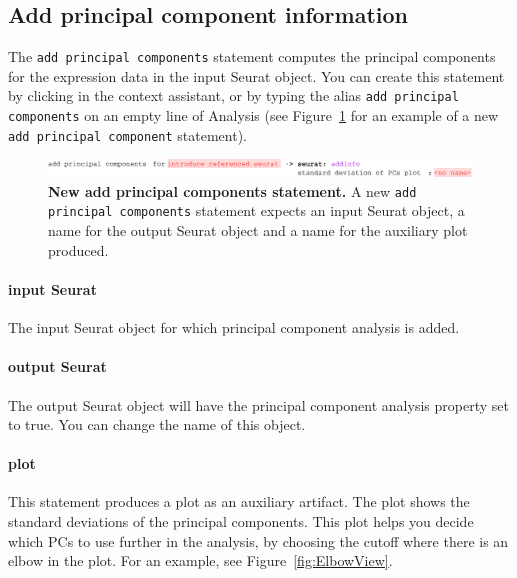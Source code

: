 \subsection{Add principal component information}
The \texttt{add principal components} statement computes the principal components for the expression
data in the input Seurat object. You can create this statement by clicking
 in the context assistant, or by typing
the alias \texttt{add principal components} on an empty line of Analysis (see Figure~\ref{fig:AddPCA}
for an example of a new \texttt{add principal component} statement).

\begin{figure}[h!tbp]
  \centering
    \includegraphics[width=\figWidthWide]{figures/AddPCA.pdf}
    \caption[New add principal components statement.]{\textbf{New add principal components statement.} A new
    \texttt{add principal components} statement expects an input Seurat object, a name for the output Seurat object
    and a name for the auxiliary plot produced.}
\label{fig:AddPCA}
\end{figure}

\paragraph{input Seurat} The input Seurat object for which principal component analysis is added.

\paragraph{output Seurat} The output Seurat object will have the principal component analysis
property set to true. You can change the name of this object.

\paragraph{plot} This statement produces a plot as an auxiliary artifact. The plot shows the
standard deviations of the principal components. This plot helps you decide which PCs to use
further in the analysis, by choosing the cutoff where there is an elbow in the plot. For
an example, see Figure~\ref{fig:ElbowView}.

